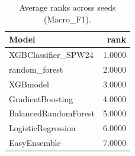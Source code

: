 \begin{table}[t]
\centering
\begin{tabular}{lr}
\toprule
Model & rank \\
\midrule
XGBClassifier_SPW24 & 1.0000 \\
random_forest & 2.0000 \\
XGBmodel & 3.0000 \\
GradientBoosting & 4.0000 \\
BalancedRandomForest & 5.0000 \\
LogisticRegression & 6.0000 \\
EasyEnsemble & 7.0000 \\
\bottomrule
\end{tabular}
\caption{Average ranks across seeds (Macro_F1).}
\label{tab:avg_rank_Macro_F1}
\end{table}